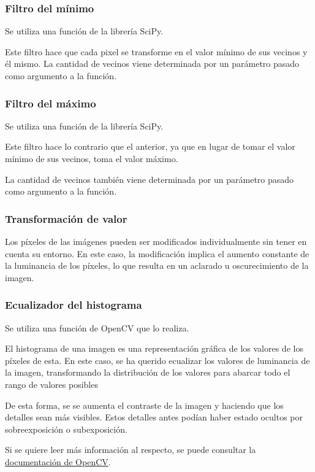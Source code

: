 \documentclass[12pt]{article}
\begin{document}
\subsubsection*{Filtro del mínimo}

Se utiliza una función de la librería SciPy.

Este filtro hace que cada pixel se transforme en el valor mínimo de sus vecinos y él mismo. La cantidad de vecinos viene determinada por un parámetro pasado como argumento a la función.


\subsubsection*{Filtro del máximo}

Se utiliza una función de la librería SciPy.

Este filtro hace lo contrario que el anterior, ya que en lugar de tomar el valor mínimo de sus vecinos, toma el valor máximo.

La cantidad de vecinos también viene determinada por un parámetro pasado como argumento a la función.

\subsubsection*{Transformación de valor}

Los píxeles de las imágenes pueden ser modificados individualmente sin tener en cuenta su entorno. En este caso, la modificación implica el aumento constante de la luminancia de los píxeles, lo que resulta en un aclarado u oscurecimiento de la imagen.

\subsubsection*{Ecualizador del histograma}

Se utiliza una función de OpenCV que lo realiza.

El histograma de una imagen es una representación gráfica de los valores de los píxeles de esta. En este caso, se ha querido ecualizar los valores de luminancia de la imagen, transformando la distribución de los valores para abarcar todo el rango de valores posibles

De esta forma, se se aumenta el contraste de la imagen y haciendo que los detalles sean más visibles. Estos detalles antes podían haber estado ocultos por sobreexposición o subexposición.

Si se quiere leer más información al respecto, se puede consultar la \href{https://docs.opencv.org/3.4/d4/d1b/tutorial_histogram_equalization.html}{documentación de OpenCV}.
\end{document}
